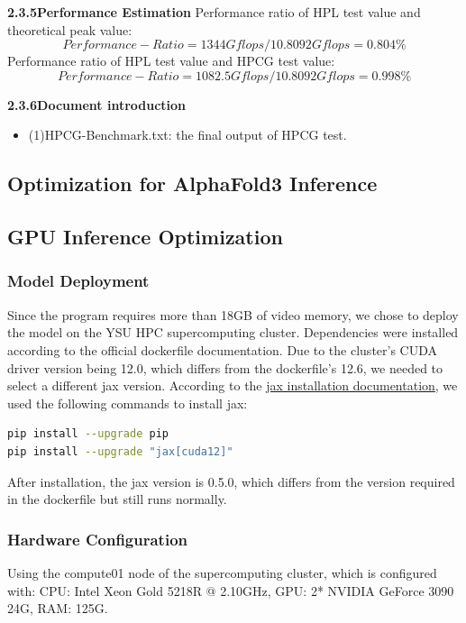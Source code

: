 \documentclass[a4paper,12pt]{article}
\begin{document}
\textbf{2.3.5Performance Estimation}
Performance ratio of HPL test value and theoretical peak value:
\begin{equation*}
Performance-Ratio = 1344Gflops/10.8092Gflops = 0.804\%
\end{equation*}
Performance ratio of HPL test value and HPCG test value:
\begin{equation*}
Performance-Ratio = 1082.5Gflops/10.8092Gflops = 0.998\%
\end{equation*}

\textbf{2.3.6Document introduction}
\begin{itemize}
    \item (1)HPCG-Benchmark.txt: the final output of HPCG test.
\end{itemize}


\subsection{Optimization for AlphaFold3 Inference}

\subsection{GPU Inference Optimization}

\subsubsection{Model Deployment}
Since the program requires more than 18GB of video memory, we chose to deploy the model on the YSU HPC supercomputing cluster. Dependencies were installed according to the official dockerfile documentation. Due to the cluster's CUDA driver version being 12.0, which differs from the dockerfile's 12.6, we needed to select a different jax version. According to the \href{https://docs.jax.dev/en/latest/installation.html#nvidia-gpu}{jax installation documentation}, we used the following commands to install jax:

\begin{lstlisting}[language=bash]
pip install --upgrade pip
pip install --upgrade "jax[cuda12]"
\end{lstlisting}

After installation, the jax version is 0.5.0, which differs from the version required in the dockerfile but still runs normally.

\subsubsection{Hardware Configuration}
Using the compute01 node of the supercomputing cluster, which is configured with: CPU: Intel Xeon Gold 5218R @ 2.10GHz, GPU: 2* NVIDIA GeForce 3090 24G, RAM: 125G.
\end{document}
